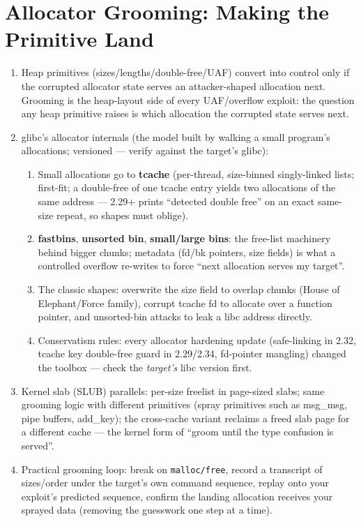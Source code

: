\documentclass[12pt]{Training}
\begin{document}
\section*{Allocator Grooming: Making the Primitive Land}
\begin{enumerate}
    \item Heap primitives (sizes/lengths/double-free/UAF) convert into control only if the corrupted allocator state serves an attacker-shaped allocation next. Grooming is the heap-layout side of every UAF/overflow exploit: the question any heap primitive raises is which allocation the corrupted state serves next.
    \item glibc's allocator internals (the model built by walking a small program's allocations; versioned --- verify against the target's glibc):
    \begin{enumerate}
        \item Small allocations go to \textbf{tcache} (per-thread, size-binned singly-linked lists; first-fit; a double-free of one tcache entry yields two allocations of the same address --- 2.29+ prints ``detected double free'' on an exact same-size repeat, so shapes must oblige).
        \item \textbf{fastbins}, \textbf{unsorted bin}, \textbf{small/large bins}: the free-list machinery behind bigger chunks; metadata (fd/bk pointers, size fields) is what a controlled overflow re-writes to force ``next allocation serves my target''.
        \item The classic shapes: overwrite the size field to overlap chunks (House of Elephant/Force family), corrupt tcache fd to allocate over a function pointer, and unsorted-bin attacks to leak a libc address directly.
        \item Conservatism rules: every allocator hardening update (safe-linking in 2.32, tcache key double-free guard in 2.29/2.34, fd-pointer mangling) changed the toolbox --- check the \emph{target's} libc version first.
    \end{enumerate}
    \item Kernel slab (SLUB) parallels: per-size freelist in page-sized slabs; same grooming logic with different primitives (spray primitives such as msg\_msg, pipe buffers, add\_key); the cross-cache variant reclaims a freed slab page for a different cache --- the kernel form of ``groom until the type confusion is served''.
    \item Practical grooming loop: break on \lstinline{malloc/free}, record a transcript of sizes/order under the target's own command sequence, replay onto your exploit's predicted sequence, confirm the landing allocation receives your sprayed data (removing the guesswork one step at a time).

\end{enumerate}
\end{document}
